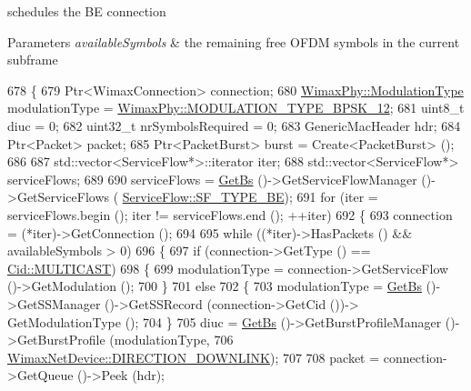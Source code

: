 schedules the BE connection 


\begin{DoxyParams}{Parameters}
{\em available\+Symbols} & the remaining free O\+F\+DM symbols in the current subframe \\
\hline
\end{DoxyParams}

\begin{DoxyCode}
678 \{
679   Ptr<WimaxConnection> connection;
680   \hyperlink{classns3_1_1WimaxPhy_a044c5d8a48ca992c39c2a946f6e755fa}{WimaxPhy::ModulationType} modulationType = 
      \hyperlink{classns3_1_1WimaxPhy_a044c5d8a48ca992c39c2a946f6e755faaef0b78541d9b66d4e85780131e665028}{WimaxPhy::MODULATION\_TYPE\_BPSK\_12};
681   uint8\_t diuc = 0;
682   uint32\_t nrSymbolsRequired = 0;
683   GenericMacHeader hdr;
684   Ptr<Packet> packet;
685   Ptr<PacketBurst> burst = Create<PacketBurst> ();
686 
687   std::vector<ServiceFlow*>::iterator iter;
688   std::vector<ServiceFlow*> serviceFlows;
689 
690   serviceFlows = \hyperlink{classns3_1_1BSScheduler_a8b09065ac8f74cb35446af55128e41c7}{GetBs} ()->GetServiceFlowManager ()->GetServiceFlows (
      \hyperlink{classns3_1_1ServiceFlow_a7990ba10be1e098328fd1e6382a26235af93a8bd8fce654e688f957f6f362e5c7}{ServiceFlow::SF\_TYPE\_BE});
691   \textcolor{keywordflow}{for} (iter = serviceFlows.begin (); iter != serviceFlows.end (); ++iter)
692     \{
693       connection = (*iter)->GetConnection ();
694 
695       \textcolor{keywordflow}{while} ((*iter)->HasPackets () && availableSymbols > 0)
696         \{
697           \textcolor{keywordflow}{if} (connection->GetType () == \hyperlink{classns3_1_1Cid_a10b8f92080ca5790e65a0bfa2f557e0aa4d3bf31623ed09b9755d86bdfa345a4a}{Cid::MULTICAST})
698             \{
699               modulationType = connection->GetServiceFlow ()->GetModulation ();
700             \}
701           \textcolor{keywordflow}{else}
702             \{
703               modulationType = \hyperlink{classns3_1_1BSScheduler_a8b09065ac8f74cb35446af55128e41c7}{GetBs} ()->GetSSManager ()->GetSSRecord (connection->GetCid ())->
      GetModulationType ();
704             \}
705           diuc = \hyperlink{classns3_1_1BSScheduler_a8b09065ac8f74cb35446af55128e41c7}{GetBs} ()->GetBurstProfileManager ()->GetBurstProfile (modulationType,
706                                                                        
      \hyperlink{classns3_1_1WimaxNetDevice_a194b6cf7eb59582328eb2531dc9ed884a5873dae7c36e21d904ae2d6922835e89}{WimaxNetDevice::DIRECTION\_DOWNLINK});
707 
708           packet = connection->GetQueue ()->Peek (hdr);

\end{DoxyCode}
